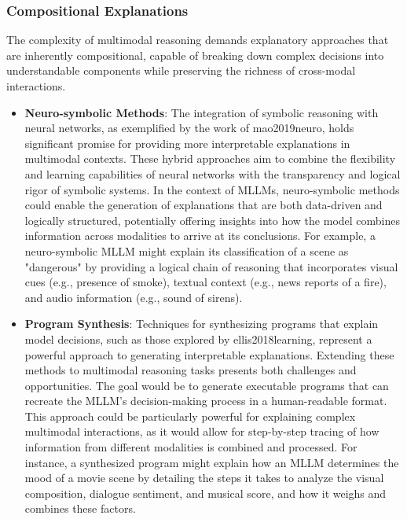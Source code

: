 \subsubsection{Compositional Explanations}
The complexity of multimodal reasoning demands explanatory approaches that are inherently compositional, capable of breaking down complex decisions into understandable components while preserving the richness of cross-modal interactions.

\begin{itemize}
    \item \textbf{Neuro-symbolic Methods}: The integration of symbolic reasoning with neural networks, as exemplified by the work of mao2019neuro, holds significant promise for providing more interpretable explanations in multimodal contexts. These hybrid approaches aim to combine the flexibility and learning capabilities of neural networks with the transparency and logical rigor of symbolic systems. In the context of MLLMs, neuro-symbolic methods could enable the generation of explanations that are both data-driven and logically structured, potentially offering insights into how the model combines information across modalities to arrive at its conclusions. For example, a neuro-symbolic MLLM might explain its classification of a scene as "dangerous" by providing a logical chain of reasoning that incorporates visual cues (e.g., presence of smoke), textual context (e.g., news reports of a fire), and audio information (e.g., sound of sirens).


    \item \textbf{Program Synthesis}: Techniques for synthesizing programs that explain model decisions, such as those explored by ellis2018learning, represent a powerful approach to generating interpretable explanations. Extending these methods to multimodal reasoning tasks presents both challenges and opportunities. The goal would be to generate executable programs that can recreate the MLLM's decision-making process in a human-readable format. This approach could be particularly powerful for explaining complex multimodal interactions, as it would allow for step-by-step tracing of how information from different modalities is combined and processed. For instance, a synthesized program might explain how an MLLM determines the mood of a movie scene by detailing the steps it takes to analyze the visual composition, dialogue sentiment, and musical score, and how it weighs and combines these factors.


\end{itemize}
